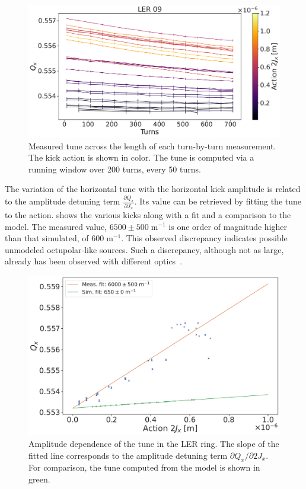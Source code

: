 \begin{figure}[!htb]
    \centering
    \includegraphics[width=0.8\linewidth]{images/kek/LER_detuned_ampdet.pdf}
    \caption{Measured tune across the length of each turn-by-turn measurement.
             The kick action is shown in color. The tune is computed
             via a running window over 200 turns, every 50 turns.}
    \label{fig:kek:ler_full_tune_ampdet}
\end{figure}

The variation of the horizontal tune with the horizontal kick amplitude is related to the amplitude
detuning term $\frac{\partial Q_x}{\partial J_x}$. Its value can be retrieved by fitting the tune to
the action.  shows the various kicks along with a fit and a comparison to
the model. The measured value, $6500 \pm 500\;\text{m}^{-1}$ is one order of magnitude higher than
that simulated, of $600\;\text{m}^{-1}$. This observed discrepancy indicates possible unmodeled
octupolar-like sources. Such a discrepancy, although not as large, already has been observed with
different optics~\cite{keintzel_jacqueline_beam_2022}.

\begin{figure}[!htb]
    \centering
    \includegraphics[width=0.7\linewidth]{images/kek/amplitude_detuning.pdf}
    \caption{Amplitude dependence of the tune in the LER ring. The slope of the fitted line corresponds to
    the amplitude detuning term $\partial Q_x/\partial 2J_x$. For comparison, the tune computed 
    from the model is shown in green.}
    \label{fig:kek:ler_ampdet}
\end{figure}



